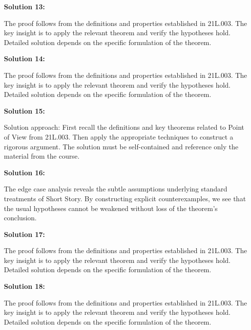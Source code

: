 \documentclass[12pt,a4paper]{exam}
\begin{document}
\vspace{0.5cm}

\textbf{Solution 13:}

The proof follows from the definitions and properties established in 21L.003. The key insight is to apply the relevant theorem and verify the hypotheses hold. Detailed solution depends on the specific formulation of the theorem.

\vspace{0.5cm}

\textbf{Solution 14:}

The proof follows from the definitions and properties established in 21L.003. The key insight is to apply the relevant theorem and verify the hypotheses hold. Detailed solution depends on the specific formulation of the theorem.

\vspace{0.5cm}

\textbf{Solution 15:}

Solution approach: First recall the definitions and key theorems related to Point of View from 21L.003. Then apply the appropriate techniques to construct a rigorous argument. The solution must be self-contained and reference only the material from the course.

\vspace{0.5cm}

\textbf{Solution 16:}

The edge case analysis reveals the subtle assumptions underlying standard treatments of Short Story. By constructing explicit counterexamples, we see that the usual hypotheses cannot be weakened without loss of the theorem's conclusion.

\vspace{0.5cm}

\textbf{Solution 17:}

The proof follows from the definitions and properties established in 21L.003. The key insight is to apply the relevant theorem and verify the hypotheses hold. Detailed solution depends on the specific formulation of the theorem.

\vspace{0.5cm}

\textbf{Solution 18:}

The proof follows from the definitions and properties established in 21L.003. The key insight is to apply the relevant theorem and verify the hypotheses hold. Detailed solution depends on the specific formulation of the theorem.
\end{document}
